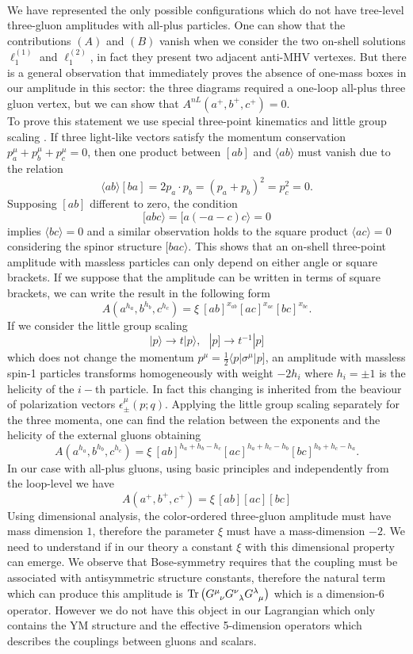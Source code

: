 \\
We have represented the only possible configurations which do not have tree-level three-gluon amplitudes with all-plus particles. One can show that the contributions $(A)$ and $(B)$ vanish when we consider the two on-shell solutions $\ell_1^{(1)}$ and $\ell_1^{(2)}$, in fact they present two adjacent anti-MHV vertexes. But there is a general observation that immediately proves the absence of one-mass boxes in our amplitude in this sector: the three diagrams required a one-loop all-plus three gluon vertex, but we can show that $A^{nL}(a^+,b^+,c^+)=0$.\\
To prove this statement we use special three-point kinematics and little group scaling \cite{2014}. If three light-like vectors satisfy the momentum conservation $p_a^\mu+p_b^\mu+p_c^\mu=0$, then one product between $[ab]$ and $\langle ab \rangle$ must vanish due to the relation
$$
	\langle ab \rangle [b a]=2p_a\cdot p_b=(p_a+p_b)^2=p_c^2=0.
$$
Supposing $[ab]$ different to zero, the condition $$[ ab c\rangle=[ a(-a-c) c\rangle=0$$ implies $\langle bc\rangle=0$ and a similar observation holds to the square product $\langle ac\rangle=0$ considering the spinor structure $[ bac\rangle$. This shows that an on-shell three-point amplitude with massless particles can only depend on either angle or square brackets. If we suppose that the amplitude can be written in terms of square brackets, we can write the result in the following form
$$
	A(a^{h_a},b^{h_b},c^{h_c})=\xi\ [ab]^{x_{ab}}[ac]^{x_{ac}}[bc]^{x_{bc}}.
$$
If we consider the little group scaling 
$$
	|p\rangle\rightarrow t |p\rangle, \ \ \ |p]\rightarrow t^{-1}|p]
$$
which does not change the momentum $p^\mu=\tfrac{1}{2}\langle p|\sigma^\mu |p]$, an amplitude with massless spin-1 particles transforms homogeneously with weight $-2h_i$ where $h_i=\pm 1$ is the helicity of the $i-$th particle. In fact this changing is inherited from the beaviour of polarization vectors $\epsilon_\pm^\mu(p;q)$. Applying the little group scaling separately for the three momenta, one can find the relation between the exponents and the helicity of the external gluons obtaining
$$
	A(a^{h_a},b^{h_b},c^{h_c})=\xi\ [ab]^{h_a+h_b-h_c}[ac]^{h_a+h_c-h_b}[bc]^{h_b+h_c-h_a}.
$$
In our case with all-plus gluons, using basic principles and independently from the loop-level we have
$$
	A(a^+,b^+,c^+)=\xi\, [ab][ac][bc]
$$
Using dimensional analysis, the  color-ordered three-gluon amplitude must have mass dimension $1$, therefore the parameter $\xi$ must have a mass-dimension $-2$. We need to understand if in our theory a constant $\xi$ with this dimensional property can emerge. We observe that Bose-symmetry requires that the coupling must be associated with antisymmetric structure constants, therefore the natural term which can produce this amplitude is $\Tr \left(\tensor{G}{^\mu_{\nu}}\tensor{G}{^\nu_{\lambda}}\tensor{G}{^\lambda_{\mu}}\right)$ which is a dimension-6 operator. However we do not have this object in our Lagrangian which only contains the YM structure and the effective 5-dimension operators which describes the couplings between gluons and scalars.\\

